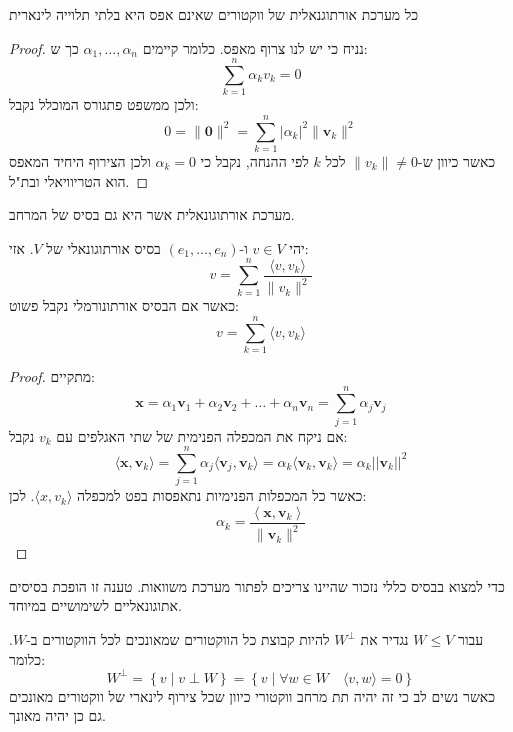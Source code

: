 \documentclass{tstextbook}
\begin{document}
\begin{corollary}
כל מערכת אורתוגנאלית של ווקטורים שאינם אפס היא בלתי תלוייה לינארית

\end{corollary}
\begin{proof}
נניח כי יש לנו צרוף מאפס. כלומר קיימים \(\alpha_{1},\dots,\alpha_{n}\) כך ש:
$$\sum_{k=1}^{n}\alpha_{k}v_{k}=0$$
ולכן ממשפט פתגורס המוכלל נקבל:
$$0=\|\mathbf{0}\|^{2}=\sum_{k=1}^{n}|\alpha_{k}|^{2}\|\mathbf{v}_{k}\|^{2}$$
כאשר כיוון ש-\(\lVert v_{k} \rVert\neq 0\) לכל \(k\) לפי ההנחה, נקבל כי \(\alpha_{k}=0\) ולכן הצירוף היחיד המאפס הוא הטריוויאלי ובת"ל.

\end{proof}
\begin{definition}
מערכת אורתוגונאלית אשר היא גם בסיס של המרחב.

\end{definition}
\begin{proposition}
יהי \(v \in V\) ו-\(\left( e_{1},\dots,e_{n} \right)\) בסיס אורתוגונאלי של \(V\). אזי:
$$v=\sum_{k=1}^{n}\frac{\langle v,v_{k} \rangle}{\lVert v_{k} \rVert ^{2}} $$
כאשר אם הבסיס אורתונורמלי נקבל פשוט:
$$v=\sum_{k=1}^{n} \langle v,v_{k} \rangle $$

\end{proposition}
\begin{proof}
מתקיים:
$$\mathbf{x}=\alpha_{1}\mathbf{v}_{1}+\alpha_{2}\mathbf{v}_{2}+\ldots+\alpha_{n}\mathbf{v}_{n}=\sum_{j=1}^{n}\alpha_{j}\mathbf{v}_{j}$$
אם ניקח את המכפלה הפנימית של שתי האגלפים עם \(v_{k}\) נקבל:
$$\langle\mathbf{x},\mathbf{v}_{k}\rangle=\sum_{j=1}^{n}\alpha_{j}\langle\mathbf{v}_{j},\mathbf{v}_{k}\rangle=\alpha_{k}\langle\mathbf{v}_{k},\mathbf{v}_{k}\rangle=\alpha_{k}||\mathbf{v}_{k}||^{2}$$
כאשר כל המכפלות הפנימיות נתאפסות בפט למכפלה \(\langle x,v_{k} \rangle\). לכן:
$$\alpha_{k}={\frac{\left\langle\mathbf{x},\mathbf{v}_{k}\right\rangle}{\|\mathbf{v}_{k}\|^{2}}}$$

\end{proof}
\begin{remark}
כדי למצוא בבסיס כללי נזכור שהיינו צריכים לפתור מערכת משוואות. טענה זו הופכת בסיסים אתוגונאליים לשימושיים במיוחד.

\end{remark}
\begin{definition}
עבור \(W\leq V\)  נגדיר את \(W^{\perp}\) להיות קבוצת כל הווקטורים שמאונכים לכל הווקטורים ב-\(W\). כלומר:
$$W^{\perp}=\left\{  v\mid v\perp W  \right\}=\left\{  v\mid \forall w \in W\quad \langle v,w \rangle =0  \right\}$$
כאשר נשים לב כי זה יהיה תת מרחב ווקטורי כיוון שכל צירוף לינארי של ווקטורים מאונכים גם כן יהיה מאונך.

\end{definition}
\end{document}
